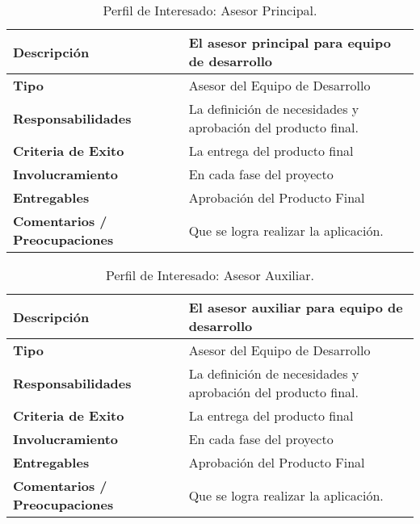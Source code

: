 \vfill

\begin{table}[h!]
  \begin{tabular}{|p{}|p{}|}
    \hline
    \textbf{Descripción} & El asesor principal para equipo de desarrollo \\
    \hline
    \textbf{Tipo} & Asesor del Equipo de Desarrollo \\
    \hline
    \textbf{Responsabilidades} & La definición de necesidades y aprobación del producto final. \\
    \hline
    \textbf{Criteria de Exito} & La entrega del producto final \\
    \hline
    \textbf{Involucramiento} & En cada fase del proyecto \\
    \hline
    \textbf{Entregables} & Aprobación del Producto Final \\
    \hline
    \textbf{Comentarios / Preocupaciones} & Que se logra realizar la aplicación. \\
    \hline
  \end{tabular}
  \caption{Perfil de Interesado: Asesor Principal.}
  \label{per-inter-a-prin}
\end{table}

\vfill

\begin{table}[h!]
  \begin{tabular}{|p{}|p{}|}
    \hline
    \textbf{Descripción} & El asesor auxiliar para equipo de desarrollo \\
    \hline
    \textbf{Tipo} & Asesor del Equipo de Desarrollo \\
    \hline
    \textbf{Responsabilidades} & La definición de necesidades y aprobación del producto final. \\
    \hline
    \textbf{Criteria de Exito} & La entrega del producto final \\
    \hline
    \textbf{Involucramiento} & En cada fase del proyecto \\
    \hline
    \textbf{Entregables} & Aprobación del Producto Final \\
    \hline
    \textbf{Comentarios / Preocupaciones} & Que se logra realizar la aplicación. \\
    \hline
  \end{tabular}
  \caption{Perfil de Interesado: Asesor Auxiliar.}
  \label{per-inter-a-aux}
\end{table}

